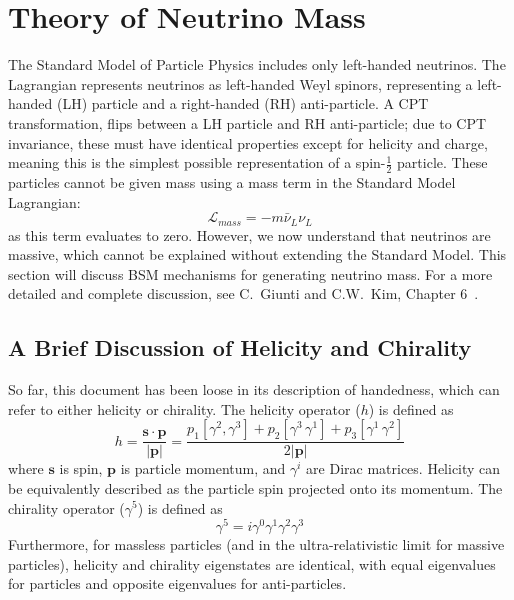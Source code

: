 \documentclass[/main.tex]{subfiles}
\begin{document}
\section{Theory of Neutrino Mass} \label{sec:numasstheory}
The Standard Model of Particle Physics includes only left-handed neutrinos.
The Lagrangian represents neutrinos as left-handed Weyl spinors, representing a left-handed (LH) particle and a right-handed (RH) anti-particle.
A CPT transformation, flips between a LH particle and RH anti-particle; due to CPT invariance, these must have identical properties except for helicity and charge, meaning this is the simplest possible representation of a spin-$\frac{1}{2}$ particle.
These particles cannot be given mass using a mass term in the Standard Model Lagrangian:
\begin{equation}
  \mathcal{L}_{mass}=-m\bar\nu_L\nu_L
\end{equation}
as this term evaluates to zero.
However, we now understand that neutrinos are massive, which cannot be explained without extending the Standard Model.
This section will discuss BSM mechanisms for generating neutrino mass.
For a more detailed and complete discussion, see C.~Giunti and C.W.~Kim, Chapter 6~\cite{Giunti}.

\subsection{A Brief Discussion of Helicity and Chirality} \label{sec:helicitychirality}
So far, this document has been loose in its description of handedness, which can refer to either helicity or chirality.
The helicity operator ($h$) is defined as
\begin{equation}
  h=\mathbf{\frac{s\cdot p}{|p|}}=\frac{p_1[\gamma^2,\gamma^3]+p_2[\gamma^3\,\gamma^1]+p_3[\gamma^1\,\gamma^2]}{2|\mathbf{p}|}
\end{equation}
where $\mathbf{s}$ is spin, $\mathbf{p}$ is particle momentum, and $\gamma^i$ are Dirac matrices.
Helicity can be equivalently described as the particle spin projected onto its momentum.
The chirality operator ($\gamma^5$) is defined as 
\begin{equation}
  \gamma^5=i\gamma^0\gamma^1\gamma^2\gamma^3
\end{equation}
Furthermore, for massless particles (and in the ultra-relativistic limit for massive particles), helicity and chirality eigenstates are identical, with equal eigenvalues for particles and opposite eigenvalues for anti-particles.
\end{document}
